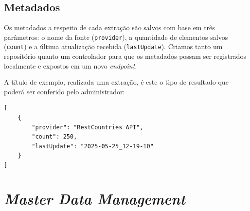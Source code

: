 \documentclass[12pt]{article}
\begin{document}
\subsection{Metadados}
Os metadados a respeito de cada extração são salvos com base em três parâmetros: o nome da fonte (\texttt{provider}), a quantidade de elementos salvos (\texttt{count}) e a última atualização recebida (\texttt{lastUpdate}). Criamos tanto um repositório quanto um controlador para que os metadados possam ser registrados localmente e expostos em um novo \emph{endpoint}.

\quad A título de exemplo, realizada uma extração, é este o tipo de resultado que poderá ser conferido pelo administrador:

\begin{lstlisting}[style=json]
[
    {
        "provider": "RestCountries API",
        "count": 250,
        "lastUpdate": "2025-05-25_12-19-10"
    }
]
\end{lstlisting}

\section{\emph{Master Data Management}}
\end{document}

